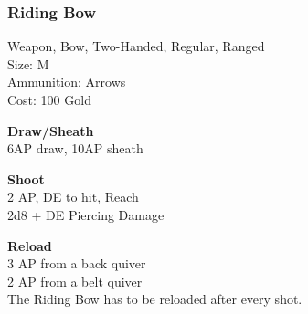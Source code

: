 \subsubsection{Riding Bow}\label{weapon:ridingBow}
Weapon, Bow, Two-Handed, Regular, Ranged\\
Size: M\\
Ammunition: Arrows\\
Cost: 100 Gold

\textbf{Draw/Sheath}\\
6AP draw, 10AP sheath

\textbf{Shoot}\\
2 AP, DE to hit,  Reach\\
2d8 + \texttimes DE Piercing Damage

\textbf{Reload}\\
3 AP from a back quiver\\
2 AP from a belt quiver\\
The Riding Bow has to be reloaded after every shot.

